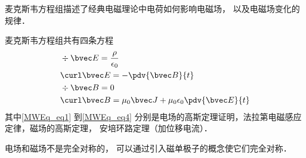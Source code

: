 
\begin{issues}
\issueDraft
\end{issues}

麦克斯韦方程组描述了经典电磁理论中电荷如何影响电磁场， 以及电磁场变化的规律．

麦克斯韦方程组共有四条方程
\begin{align}
\label{MWEq_eq1}
&\div \bvec E = \frac{\rho}{\epsilon_0}\\
\label{MWEq_eq2}
&\curl \bvec E = -\pdv{\bvec B}{t}\\
\label{MWEq_eq3}
&\div \bvec B = 0 \\
\label{MWEq_eq4}
&\curl \bvec B = \mu_0 \bvec J + \mu_0\epsilon_0 \pdv{\bvec E}{t}
\end{align}
其中\autoref{MWEq_eq1} 到\autoref{MWEq_eq4} 分别是电场的高斯定理证明，法拉第电磁感应定律，磁场的高斯定理， 安培环路定理（加位移电流）．%

电场和磁场不是完全对称的， 可以通过引入磁单极子的概念使它们完全对称．
